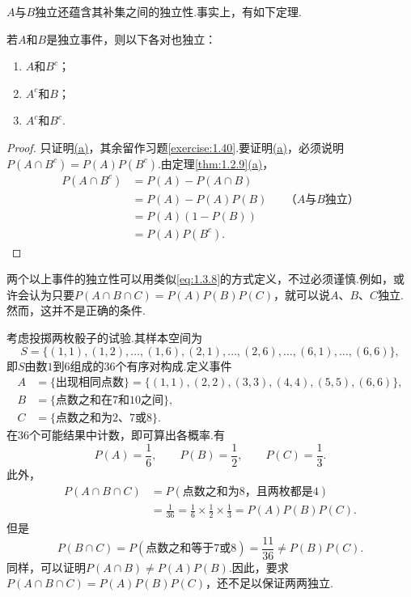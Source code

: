 $A$与$B$独立还蕴含其补集之间的独立性.事实上，有如下定理.
\begin{theorem}\label{thm:1.3.9}
若$A$和$B$是独立事件，则以下各对也独立：
\begin{enumerate}[label=\alph*.]
\item\label{item:1.3.9a}$A$和$B^c$；
\item\label{item:1.3.9b}$A^c$和$B$；
\item\label{item:1.3.9c}$A^c$和$B^c$.
\end{enumerate}
\end{theorem}
\begin{proof}
只证明\hyperref[item:1.3.9a]{(a)}，其余留作习题\ref{exercise:1.40}.要证明\hyperref[item:1.3.9a]{(a)}，必须说明$P(A\cap B^c)=P(A)P(B^c)$.由定理\ref{thm:1.2.9}\hyperref[itm:thm:1.2.9:a]{(a)}，
\begin{equation*}\begin{aligned}
P(A\cap B^c)&=P(A)-P(A\cap B)\\
&=P(A)-P(A)P(B)&&\text{（$A$与$B$独立）}\\
&=P(A)(1-P(B))\\
&=P(A)P(B^c).
\end{aligned}\end{equation*}
\end{proof}

两个以上事件的独立性可以用类似\eqref{eq:1.3.8}的方式定义，不过必须谨慎.例如，或许会认为只要$P(A\cap B\cap C)=P(A)P(B)P(C)$，就可以说$A$、$B$、$C$独立.然而，这并不是正确的条件.


\begin{example}[投掷两枚骰子]\label{ex:1.3.10}
考虑投掷两枚骰子的试验.其样本空间为
$$S=\{(1,1),(1,2),\ldots,(1,6),(2,1),\ldots,(2,6),\ldots,(6,1),\ldots,(6,6)\},$$
即$S$由数$1$到$6$组成的36个有序对构成.定义事件
\begin{equation*}\begin{aligned}
A&=\{\text{出现相同点数}\}=\{(1,1),(2,2),(3,3),(4,4),(5,5),(6,6)\},\\
B&=\{\text{点数之和在7和10之间}\},\\
C&=\{\text{点数之和为2、7或8}\}.
\end{aligned}\end{equation*}
在36个可能结果中计数，即可算出各概率.有
$$P(A)=\frac16,\qquad P(B)=\frac12,\qquad P(C)=\frac13.$$
此外，
\begin{equation*}\begin{aligned}
P(A\cap B\cap C)&=P(\text{点数之和为8，且两枚都是4})\\
&=\frac1{36}=\frac16\times\frac12\times\frac13=P(A)P(B)P(C).
\end{aligned}\end{equation*}
但是
$$P(B\cap C)=P(\text{点数之和等于7或8})=\frac{11}{36}\ne P(B)P(C).$$
同样，可以证明$P(A\cap B)\ne P(A)P(B)$.因此，要求$P(A\cap B\cap C)=P(A)P(B)P(C)$，还不足以保证两两独立.
\end{example}

